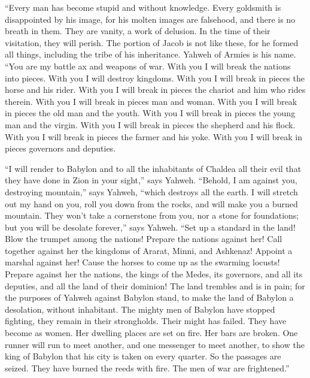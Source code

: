  ``Every man has become stupid and without knowledge.
Every goldsmith is disappointed by his image, for his molten images are
falsehood, and there is no breath in them.  They are
vanity, a work of delusion. In the time of their visitation, they will
perish.  The portion of Jacob is not like these, for he
formed all things, including the tribe of his inheritance. Yahweh of
Armies is his name.  ``You are my battle ax and weapons
of war. With you I will break the nations into pieces. With you I will
destroy kingdoms.  With you I will break in pieces the
horse and his rider.  With you I will break in pieces the
chariot and him who rides therein. With you I will break in pieces man
and woman. With you I will break in pieces the old man and the youth.
With you I will break in pieces the young man and the virgin.
 With you I will break in pieces the shepherd and his
flock. With you I will break in pieces the farmer and his yoke. With you
I will break in pieces governors and deputies.

 ``I will render to Babylon and to all the inhabitants of
Chaldea all their evil that they have done in Zion in your sight,'' says
Yahweh.  ``Behold, I am against you, destroying
mountain,'' says Yahweh, ``which destroys all the earth. I will stretch
out my hand on you, roll you down from the rocks, and will make you a
burned mountain.  They won't take a cornerstone from you,
nor a stone for foundations; but you will be desolate forever,'' says
Yahweh.  ``Set up a standard in the land! Blow the
trumpet among the nations! Prepare the nations against her! Call
together against her the kingdoms of Ararat, Minni, and Ashkenaz!
Appoint a marshal against her! Cause the horses to come up as the
swarming locusts!  Prepare against her the nations, the
kings of the Medes, its governors, and all its deputies, and all the
land of their dominion!  The land trembles and is in
pain; for the purposes of Yahweh against Babylon stand, to make the land
of Babylon a desolation, without inhabitant.  The mighty
men of Babylon have stopped fighting, they remain in their strongholds.
Their might has failed. They have become as women. Her dwelling places
are set on fire. Her bars are broken.  One runner will
run to meet another, and one messenger to meet another, to show the king
of Babylon that his city is taken on every quarter.  So
the passages are seized. They have burned the reeds with fire. The men
of war are frightened.''

